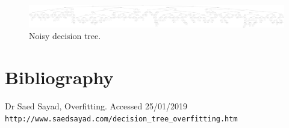 \documentclass{article}
\begin{document}
\newpage

\begin{figure}
\centering
\includegraphics [width=\textwidth,height=\textheight,keepaspectratio]{figures/noisy_tree.png}
\caption{ Noisy decision tree. }
\label{noisyt:s2}
\end{figure}
\clearpage


\section{Bibliography}

\begin{thebibliography}{9}
Dr Saed Sayad, Overfitting. Accessed 25/01/2019
\\\texttt{http://www.saedsayad.com/decision{\_tree\_overfitting.htm}}
\end{thebibliography}
\end{document}
